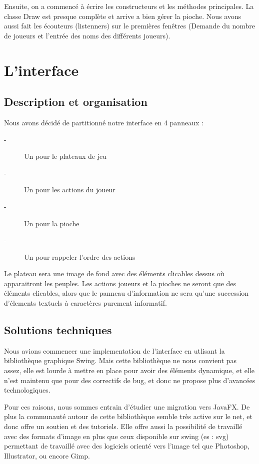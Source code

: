 \documentclass[11pt]{report}
\begin{document}
	Ensuite, on a commencé à écrire les constructeurs et les méthodes principales. La classe Draw est presque complète et arrive a bien gérer la pioche. Nous avons aussi fait les écouteurs (listenners) sur le premières fenêtres (Demande du nombre de joueurs et l'entrée des noms des différents joueurs). 

\chapter{L'interface}

	\section{Description et organisation}
		Nous avons décidé de partitionné notre interface en 4 panneaux :
		\begin{description}
			\item[-]Un pour le plateaux de jeu
			\item[-]Un pour les actions du joueur
			\item[-]Un pour la pioche
			\item[-]Un pour rappeler l'ordre des actions
		\end{description}	
		
		Le plateau sera une image de fond avec des éléments clicables dessus où apparaitront les peuples. Les actions joueurs et la pioches ne seront que des éléments clicables, alors	que le panneau d'information ne sera qu'une succession d'élements textuels à caractères purement informatif.  
	\section{Solutions techniques}
		Nous avions commencer une implementation de l'interface en utlisant la bibliothèque graphique Swing. Mais cette bibliothèque ne nous convient pas assez, elle est lourde à mettre en place pour avoir des éléments dynamique, et elle n'est maintenu que pour des correctifs de bug, et donc ne propose plus d'avancées technologiques. 
		
		Pour ces raisons, nous sommes entrain d'étudier une migration vers JavaFX. De plus la communauté autour de cette bibliothèque semble très active sur le net, et donc offre un soutien et des tutoriels. Elle offre aussi la possibilité de travaillé avec des formats d'image en plus que ceux disponible sur swing (es : svg) permettant de travaillé avec des logiciels orienté vers l'image tel que Photoshop\up{\copyright}, Illustrator\up{\copyright}, ou encore Gimp\up{\copyright}. 
		
\end{document}
